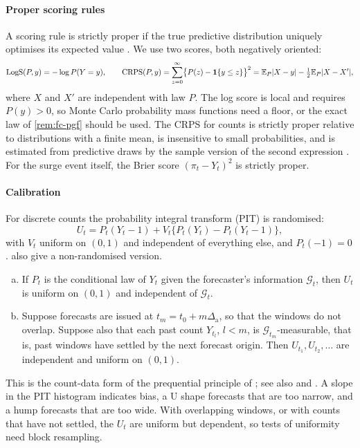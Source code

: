 \paragraph{Proper scoring rules} A scoring rule is strictly proper if the true
predictive distribution uniquely optimises its expected value \citep{gneiting2007}. We
use two scores, both negatively oriented:
\begin{equation}\label{eq:fc-scores}
  \mathrm{LogS}(P,y)=-\log P(Y=y),\qquad
  \mathrm{CRPS}(P,y)=\sum_{z=0}^{\infty}\bigl\{P(z)-\mathbf{1}\!\left\{y\le z\right\}\bigr\}^2
  =\mathbb{E}_P|X-y|-\tfrac12\mathbb{E}_P|X-X'| ,
\end{equation}
where $X$ and $X'$ are independent with law $P$. The log score is local and requires
$P(y)>0$, so Monte Carlo probability mass functions need a floor, or the exact law of
\cref{rem:fc-pgf} should be used. The CRPS for counts is strictly proper relative to
distributions with a finite mean, is insensitive to small probabilities, and is estimated
from predictive draws by the sample version of the second expression
\citep{gneiting2007,czado2009}. For the surge event itself, the Brier score
$(\pi_t-Y_t)^2$ is strictly proper.

\paragraph{Calibration} For discrete counts the probability integral transform (PIT)
is randomised:
\[
U_t=P_t(Y_t-1)+V_t\bigl\{P_t(Y_t)-P_t(Y_t-1)\bigr\},
\]
with $V_t$ uniform on $(0,1)$ and independent of everything else, and $P_t(-1)=0$.
 also give a non-randomised version.

\begin{lemma}\label{lem:fc-pit}
\begin{enumerate}[(a)]
  \item If $P_t$ is the conditional law of $Y_t$ given the forecaster's information
  $\mathcal G_t$, then $U_t$ is uniform on $(0,1)$ and independent of $\mathcal G_t$.
  \item Suppose forecasts are issued at $t_m=t_0+m\Delta_{\mathrm a}$, so that the windows do not
  overlap. Suppose also that each past count $Y_{t_l}$, $l<m$, is
  $\mathcal G_{t_m}$-measurable, that is, past windows have settled by the next forecast
  origin. Then $U_{t_1},U_{t_2},\dots$ are independent and uniform on $(0,1)$.
\end{enumerate}
\end{lemma}

This is the count-data form of the prequential principle of \citet{dawid1984}; see also
\citet{gneiting2007b} and \citet{czado2009}. A slope in the PIT histogram indicates bias,
a U shape forecasts that are too narrow, and a hump forecasts that are too wide. With
overlapping windows, or with counts that have not settled, the $U_t$ are uniform but
dependent, so tests of uniformity need block resampling.

